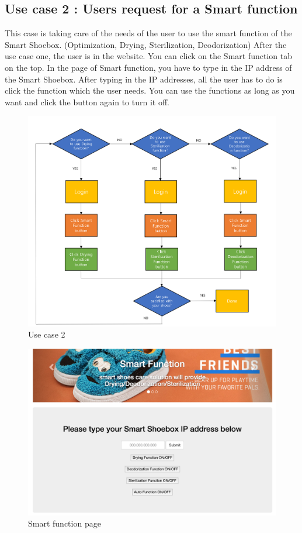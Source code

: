 \documentclass[conference]{IEEEtran}
\begin{document}
\subsection{Use case 2 : Users request for a Smart function} This case is taking care of the needs of the user to use the smart function of the Smart Shoebox. (Optimization, Drying, Sterilization, Deodorization) After the use case one, the user is in the website. You can click on the Smart function tab on the top. In the page of Smart function, you have to type in the IP address of the Smart Shoebox. After typing in the IP addresses, all the user has to do is click the function which the user needs. You can use the functions as long as you want and click the button again to turn it off.
\begin{figure}[h]
\begin{center}
    \includegraphics[scale=0.3]{usecase2}
    \caption{Use case 2} \label{fig:label}
\end{center}
\end{figure}
\begin{figure}[h]
\begin{center}
    \includegraphics[scale=0.25]{capture4}
    \caption{Smart function page} \label{fig:label}
\end{center}
\end{figure}
\end{document}

